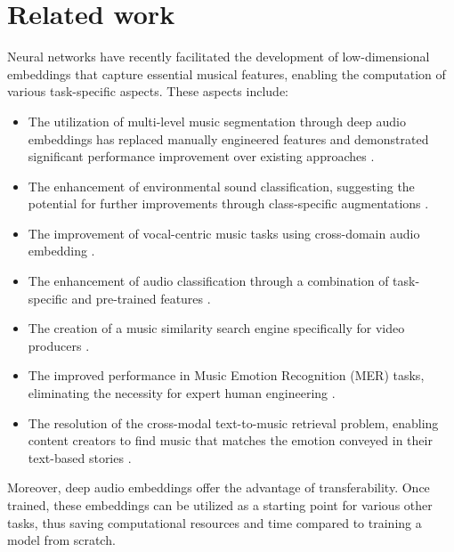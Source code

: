 \section{Related work}

Neural networks have recently facilitated the development of low-dimensional embeddings that capture essential musical features, enabling the computation of various task-specific aspects. These aspects include:

\begin{itemize}

\item The utilization of multi-level music segmentation through deep audio embeddings has replaced manually engineered features and demonstrated significant performance improvement over existing approaches \cite{SalamonDeepSegmentation}.

\item The enhancement of environmental sound classification, suggesting the potential for further improvements through class-specific augmentations \cite{Kim2020OneStrategies}.

\item The improvement of vocal-centric music tasks using cross-domain audio embedding \cite{Kim2021LearningLoss}.

\item The enhancement of audio classification through a combination of task-specific and pre-trained features \cite{Hung2022Feature-informedClassification}.

\item The creation of a music similarity search engine specifically for video producers \cite{epidemic}.

\item The improved performance in Music Emotion Recognition (MER) tasks, eliminating the necessity for expert human engineering \cite{KohComparisonRecognition}.

\item The resolution of the cross-modal text-to-music retrieval problem, enabling content creators to find music that matches the emotion conveyed in their text-based stories \cite{WonEmotionStories}.
\end{itemize}

Moreover, deep audio embeddings offer the advantage of transferability. Once trained, these embeddings can be utilized as a starting point for various other tasks, thus saving computational resources and time compared to training a model from scratch.

